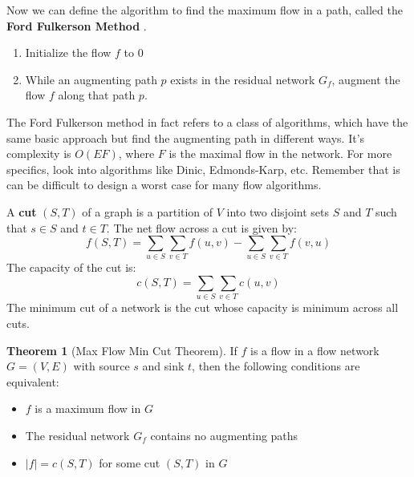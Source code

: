 \documentclass[12pt,letterpaper]{article}
\theoremstyle{definition}
\newtheorem{theorem}{Theorem}[section] %
\begin{document}
Now we can define the algorithm to find the maximum flow in a path, called the \textbf{Ford Fulkerson Method} .

\begin{enumerate}
  \item Initialize the flow $f$ to 0
  \item While an augmenting path $p$ exists in the residual network $G_f$, augment the flow $f$ along that path $p$.
\end{enumerate}

The Ford Fulkerson method in fact refers to a class of algorithms, which have the same basic approach but find the augmenting path in different ways. It's complexity is $O(EF)$, where $F$ is the maximal flow in the network. For more specifics, look into algorithms like Dinic, Edmonds-Karp, etc. Remember that is can be difficult to design a worst case for many flow algorithms.

A \textbf{cut} $(S,T)$ of a graph is a partition of $V$ into two disjoint sets $S$ and $T$ such that $s \in S$ and $t \in T$. The net flow across a cut is given by:
\[f(S,T) = \sum_{u \in S}\sum_{v \in T} f(u,v) - \sum_{u \in S} \sum_{v \in T} f(v,u)\]
The capacity of the cut is:
\[c(S,T) = \sum_{u \in S} \sum_{v \in T} c(u,v)\]
The minimum cut of a network is the cut whose capacity is minimum across all cuts.

\begin{theorem}[Max Flow Min Cut Theorem]
  If $f$ is a flow in a flow network $G=(V,E)$ with source $s$ and sink $t$, then the following conditions are equivalent:
  \begin{itemize}
    \item $f$ is a maximum flow in $G$
    \item The residual network $G_f$ contains no augmenting paths
    \item $|f| = c(S,T)$ for some cut $(S,T)$ in $G$
  \end{itemize}
\end{theorem}
\end{document}
